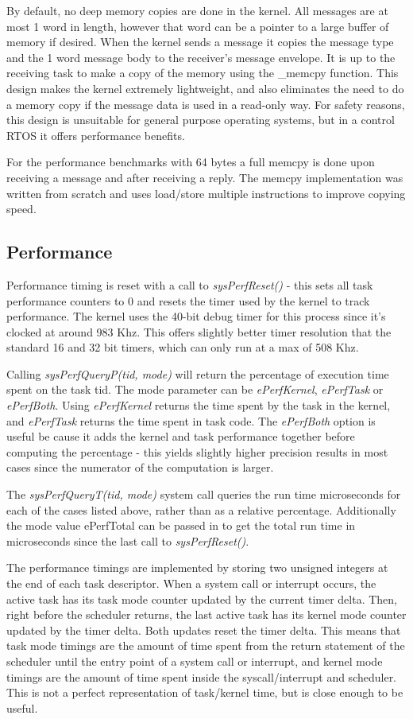 \documentclass[twoside,a4paper]{refart}
\begin{document}
By default, no deep memory copies are done in the kernel. All messages are at most 1 word in length, however that word can be a pointer to a large buffer of memory if desired. When the kernel sends a message it copies the message type and the 1 word message body to the receiver’s message envelope. It is up to the receiving task to make a copy of the memory using the \_memcpy function. This design makes the kernel extremely lightweight, and also eliminates the need to do a memory copy if the message data is used in a read-only way. For safety reasons, this design is unsuitable for general purpose operating systems, but in a control RTOS it offers performance benefits.

For the performance benchmarks with 64 bytes a full memcpy is done upon receiving a message and after receiving a reply. The memcpy implementation was written from scratch and uses load/store multiple instructions to improve copying speed.

\subsection{Performance}
Performance timing is reset with a call to \textit{sysPerfReset()} - this sets all task performance counters to 0 and resets the timer used by the kernel to track performance. The kernel uses the 40-bit debug timer for this process since it’s clocked at around 983 Khz. This offers slightly better timer resolution that the standard 16 and 32 bit timers, which can only run at a max of 508 Khz.

Calling \textit{sysPerfQueryP(tid, mode)} will return the percentage of execution time spent on the task tid. The mode parameter can be \textit{ePerfKernel}, \textit{ePerfTask} or \textit{ePerfBoth}. Using \textit{ePerfKernel} returns the time spent by the task in the kernel, and \textit{ePerfTask} returns the time spent in task code. The \textit{ePerfBoth} option is useful be cause it adds the kernel and task performance together before computing the percentage - this yields slightly higher precision results in most cases since the numerator of the computation is larger.

The \textit{sysPerfQueryT(tid, mode)} system call queries the run time microseconds for each of the cases listed above, rather than as a relative percentage. Additionally the mode value ePerfTotal can be passed in to get the total run time in microseconds since the last call to \textit{sysPerfReset()}.

The performance timings are implemented by storing two unsigned integers at the end of each task descriptor. When a system call or interrupt occurs, the active task has its task mode counter updated by the current timer delta. Then, right before the scheduler returns, the last active task has its kernel mode counter updated by the timer delta. Both updates reset the timer delta. This means that task mode timings are the amount of time spent from the return statement of the scheduler until the entry point of a system call or interrupt, and kernel mode timings are the amount of time spent inside the syscall/interrupt and scheduler. This is not a perfect representation of task/kernel time, but is close enough to be useful.
\end{document}
